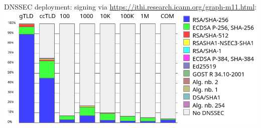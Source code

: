 \begin{frame}{DNSSEC deployment: signing}
via \url{https://ithi.research.icann.org/graph-m11.html}: \\
\includegraphics[height=0.8\textheight]{../dns/ithi-dnssec-deploy-oct-domains}
\end{frame}

